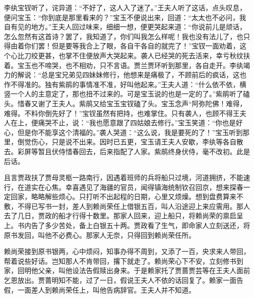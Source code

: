 \begin{parag}
    李纨宝钗听了，诧异道：“不好了，这人入了迷了。”王夫人听了这话，点头叹息，便问宝玉：“你到底是那里看来的？”宝玉不便说出来，回道：“太太也不必问，我自有见的地方。”王夫人回过味来，细细一想，便更哭起来道：“你说前儿是顽话，怎么忽然有这首诗？罢了，我知道了，你们叫我怎么样呢！我也没有法儿了，也只得由着你们罢！但是要等我合上了眼，各自干各自的就完了！”宝钗一面劝着，这个心比刀绞更甚，也掌不住便放声大哭起来。袭人已经哭的死去活来，幸亏秋纹扶着。宝玉也不啼哭，也不相劝，只不言语。贾兰贾环听到那里，各自走开。李纨竭力的解说：“总是宝兄弟见四妹妹修行，他想来是痛极了，不顾前后的疯话，这也作不得准的。独有紫鹃的事情准不准，好叫他起来。”王夫人道：“什么依不依，横竖一个人的主意定了，那也扭不过来的。可是宝玉说的也是一定的了。”紫鹃听了磕头。惜春又谢了王夫人。紫鹃又给宝玉宝钗磕了头。宝玉念声“阿弥陀佛！难得，难得。不料你倒先好了！”宝钗虽然有把持，也难掌住。只有袭人，也顾不得王夫人在上，便痛哭不止，说：“我也愿意跟了四姑娘去修行。”宝玉笑道：“你也是好心，但是你不能享这个清福的。”袭人哭道：“这么说，我是要死的了！”宝玉听到那里，倒觉伤心，只是说不出来。因时已五更，宝玉请王夫人安歇，李纨等各自散去。彩屏等暂且伏侍惜春回去，后来指配了人家。紫鹃终身伏侍，毫不改初。此是后话。
\end{parag}


\begin{parag}
    且言贾政扶了贾母灵柩一路南行，因遇着班师的兵将船只过境，河道拥挤，不能速行，在道实在心焦。幸喜遇见了海疆的官员，闻得镇海统制钦召回京，想来探春一定回家，略略解些烦心。只打听不出起程的日期，心里又烦燥。想到盘费算来不敷，不得已写书一封，差人到赖尚荣任上借银五百，叫人沿途迎上来应需用。那人去了几日，贾政的船才行得十数里。那家人回来，迎上船只，将赖尚荣的禀启呈上。书内告了多少苦处，备上白银五十两。贾政看了生气，即命家人立刻送还，将原书发回，叫他不必费心。那家人无奈，只得回到赖尚荣任所。
\end{parag}


\begin{parag}
    赖尚荣接到原书银两，心中烦闷，知事办得不周到，又添了一百，央求来人带回，帮着说些好话。岂知那人不肯带回，撂下就走了。赖尚荣心下不安，立刻修书到家，回明他父亲，叫他设法告假赎出身来。于是赖家托了贾蔷贾芸等在王夫人面前乞恩放出。贾蔷明知不能，过了一日，假说王夫人不依的话回复了。赖家一面告假，一面差人到赖尚荣任上，叫他告病辞官。王夫人并不知道。
\end{parag}


